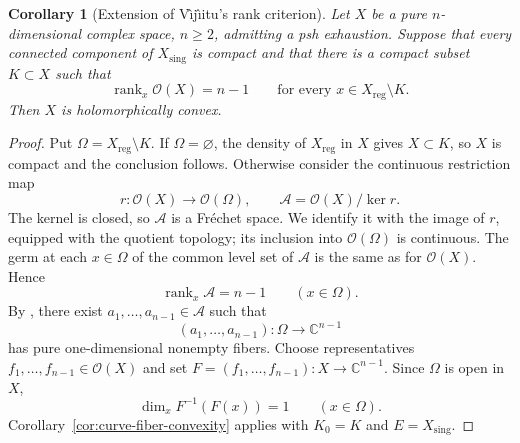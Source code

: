 \documentclass[11pt]{amsart}
\newtheorem{corollary}[theorem]{Corollary}
\theoremstyle{definition}
\theoremstyle{remark}
\numberwithin{equation}{section}
\newcommand{\C}{\mathbb C}
\newcommand{\OO}{\mathcal O}
\begin{document}
\begin{corollary}[Extension of V\^{\i}j\^{\i}itu's rank criterion]
\label{cor:curve-rank-recovery}
Let $X$ be a pure $n$-dimensional complex space, $n\ge2$, admitting
a psh exhaustion. Suppose that every connected component
of $X_{\mathrm{sing}}$ is compact and that there is a compact subset
$K\subset X$ such that
\[
 \operatorname{rank}_x\OO(X)=n-1
 \qquad\text{for every }x\in X_{\mathrm{reg}}\setminus K.
\]
Then $X$ is holomorphically convex.
\end{corollary}

\begin{proof}
Put $\Omega=X_{\mathrm{reg}}\setminus K$. If $\Omega=\varnothing$,
the density of $X_{\mathrm{reg}}$ in $X$ gives $X\subset K$,
so $X$ is compact and the conclusion follows.
Otherwise consider the continuous restriction map
\[
 r:\OO(X)\longrightarrow\OO(\Omega),
 \qquad \mathcal A=\OO(X)/\ker r.
\]
The kernel is closed, so $\mathcal A$ is a Fr\'echet space.
We identify it with the image of $r$, equipped with the quotient
topology; its inclusion into $\OO(\Omega)$ is continuous.
The germ at each $x\in\Omega$ of the common level set of
$\mathcal A$ is the same as for $\OO(X)$. Hence
\[
 \operatorname{rank}_x\mathcal A=n-1\qquad(x\in\Omega).
\]
By \cite[Theorem~3.1]{VijituForum2022}, there exist
$a_1,\ldots,a_{n-1}\in\mathcal A$ such that
\[
 (a_1,\ldots,a_{n-1}):\Omega\longrightarrow\C^{n-1}
\]
has pure one-dimensional nonempty fibers. Choose representatives
$f_1,\ldots,f_{n-1}\in\OO(X)$ and set
$F=(f_1,\ldots,f_{n-1}):X\to\C^{n-1}$.
Since $\Omega$ is open in $X$,
\[
 \dim_xF^{-1}(F(x))=1\qquad(x\in\Omega).
\]
Corollary~\ref{cor:curve-fiber-convexity} applies with
$K_0=K$ and $E=X_{\mathrm{sing}}$.
\end{proof}
\end{document}
